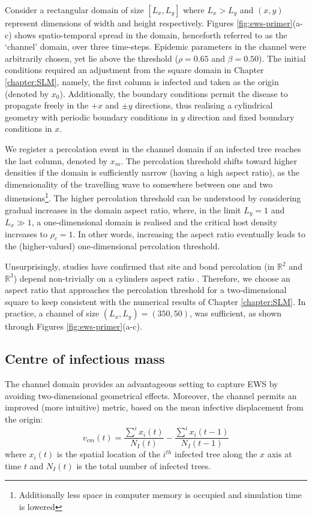 Consider a rectangular domain of size $[L_x, L_y]$ where $L_x>L_y$ and $(x, y)$ represent dimensions of width and height respectively.
Figures \ref{fig:ews-primer}(a-c) shows spatio-temporal spread in the domain, henceforth referred to as the `channel' domain, over three time-steps.
Epidemic parameters in the channel were arbitrarily chosen, yet lie above the threshold ($\rho=0.65$ and $\beta=0.50$).
The initial conditions required an adjustment from the square domain in Chapter \ref{chapter:SLM}, namely, the first column is infected and taken as the origin (denoted by $x_0$).
Additionally, the boundary conditions permit the disease to propagate freely in the $+x$ and $\pm y$ directions, thus realising a cylindrical geometry with periodic boundary conditions in $y$ direction and fixed boundary conditions in $x$.

We register a percolation event in the channel domain if an infected tree reaches the last column, denoted by $x_m$.
The percolation threshold shifts toward higher densities if the domain is sufficiently narrow (having a high aspect ratio), as the dimensionality of the travelling wave to somewhere between one and two dimensions\footnote{Additionally less space in computer memory is occupied and simulation time is lowered}. 
The higher percolation threshold can be understood by considering gradual increases in the domain aspect ratio, 
where, in the limit $L_y = 1$ and $L_x \gg 1$, a one-dimensional domain is realised and the critical host density increases to $\rho_c=1$.
In other words, increasing the aspect ratio eventually leads to the (higher-valued) one-dimensional percolation threshold.

Unsurprisingly, studies have confirmed that site and bond percolation (in $\mathbb{R}^2$ and  $\mathbb{R}^3$) depend non-trivially on a cylinders aspect ratio \cite{sangare2009continuum}.
Therefore, we choose an aspect ratio that approaches the percolation threshold for a two-dimensional square to keep consistent with the numerical results of Chapter \ref{chapter:SLM}. 
In practice, a channel of size $(L_x, L_y) = (350, 50)$, was sufficient, as shown through Figures \ref{fig:ews-primer}(a-c). 


\subsection{Centre of infectious mass}

The channel domain provides an advantageous setting to capture EWS by avoiding two-dimensional geometrical effects.
Moreover, the channel permits an improved (more intuitive) metric, based on the mean infective displacement from the origin:
\begin{equation}
   v_{cm}(t) = \frac{\sum^i x_i(t)}{N_I(t)} - \frac{\sum^i x_i(t-1)}{N_I(t-1)}
   \label{eq:COM}
\end{equation}
where $x_i(t)$ is the spatial location of the $i^{th}$ infected tree along the $x$ axis at time $t$ and $N_I(t)$ is the total number of infected trees. 

